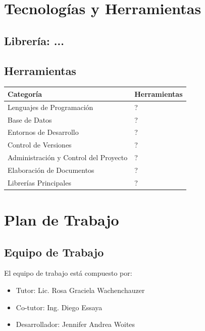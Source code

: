 \documentclass[a4paper]{article}
\begin{document}
\section{Tecnologías y Herramientas}

\subsection{Librería: ...}

\subsection{Herramientas}

\begin{table}[htbp]
\begin{center}
\begin{tabular}{|l|l|}
\hline
\textbf{Categoría}				 			& 		\textbf{Herramientas} \\
\hline
Lenguajes de Programación 					&		? \\
\hline
Base de Datos			 					&		? \\
\hline
Entornos de Desarrollo						& 		? \\
\hline
Control de Versiones						& 		? \\
\hline
Administración y Control del Proyecto		& 		? \\
\hline
Elaboración de Documentos					& 		? \\
\hline
Librerías Principales						& 		? \\
\hline
\end{tabular}
\end{center}
\end{table}

\section{Plan de Trabajo}

\subsection{Equipo de Trabajo}

El equipo de trabajo está compuesto por:

\begin{itemize}
	\item Tutor: Lic. Rosa Graciela Wachenchauzer
	\item Co-tutor: Ing. Diego Essaya
	\item Desarrollador: Jennifer Andrea Woites
\end{itemize}
\end{document}
